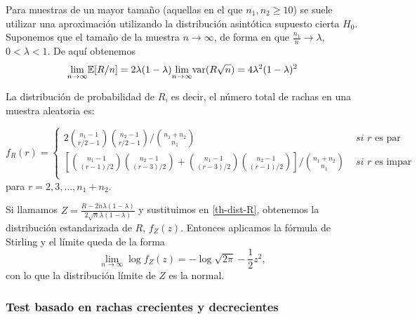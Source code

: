 	Para muestras de un mayor tamaño (aquellas en el que 
$n_1, n_2 \geq 10$) se suele utilizar una aproximación 
utilizando la distribución asintótica supuesto cierta 
$H_0$.\\
	Suponemos que el tamaño de la muestra $n \rightarrow 
\infty$, de forma en que $\frac{n_1}{n} \rightarrow \lambda$, 
$0<\lambda<1$. De aquí obtenemos
	\[ \underset{n \rightarrow \infty}{\lim} \mathbb{E}[R/n] = 
			2\lambda (1-\lambda) 
				\underset{n \rightarrow \infty}{\lim} 
					\text{var}(R\sqrt{n}) =
			4\lambda^2(1-\lambda)^2
	\]
	
\begin{teorema}
	La distribución de probabilidad de $R$, es decir, el 
número total de rachas en una muestra aleatoria es:
	
	\begin{equation}
		f_R(r) = \left\lbrace\begin{array}{ll}
	2 {n_1-1 \choose r/2-1} {n_2-1 \choose r/2-1} 
		\big/ {n_1 + n_2 \choose n_1} &
			\textit{ si } r \text{ es par} \\
	\left[
		{n_1-1 \choose (r-1)/2} {n_2-1 \choose (r-3)/2} +  
		{n_1-1 \choose (r-3)/2} {n_2-1 \choose (r-1)/2} 
	\right]
		\big/ {n_1 + n_2 \choose n_1} &
			\textit{ si } r \text{ es impar} \\		
		\end{array}\right.
	\label{th-dist-R}
	\end{equation}
	para $r=2, 3, \dots, n_1 + n_2.$
\end{teorema}
	
	Si llamamos $Z = \frac{R - 2n\lambda (1-\lambda)}
{2 \sqrt{n}\lambda (1-\lambda)}$ y sustituimos en 
\ref{th-dist-R}, obtenemos la distribución estandarizada de 
$R$, $f_Z(z)$. Entonces aplicamos la fórmula de Stirling y el 
límite queda de la forma
	\[ \underset{n \rightarrow \infty}{\lim} \log f_Z(z)=
			-\log \sqrt{2\pi} - \frac{1}{2} z^2,	\]
	con lo que la distribución límite de $Z$ es la normal. 
	
	
\subsubsection{Test basado en rachas crecientes y decrecientes}	

